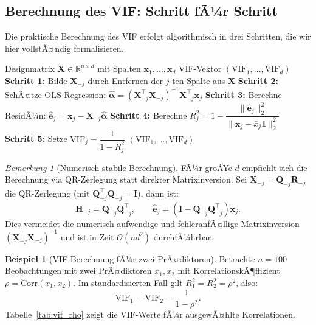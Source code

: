 ﻿\documentclass[12pt, a4paper]{article}
\theoremstyle{definition}
\newtheorem{example}[theorem]{Beispiel}
\theoremstyle{remark}
\newtheorem{remark}[theorem]{Bemerkung}
\newcommand{\R}{\mathbb{R}}
\newcommand{\vx}{\bm{x}}
\newcommand{\vX}{\bm{X}}
\newcommand{\T}{\top}
\begin{document}
\subsection{Berechnung des VIF: Schritt fÃ¼r Schritt}

Die praktische Berechnung des VIF erfolgt algorithmisch in drei Schritten, die wir hier
vollstÃ¤ndig formalisieren.

\begin{algorithm}[H]
	\caption{Berechnung der Varianzinflationsfaktoren}
	\label{alg:vif}
	\begin{algorithmic}[1]
		\Require Designmatrix $\vX \in \R^{n \times d}$ mit Spalten $\vx_1, \ldots, \vx_d$
		\Ensure VIF-Vektor $(\mathrm{VIF}_1, \ldots, \mathrm{VIF}_d)$
		\State \textbf{Schritt 1:} Bilde $\vX_{-j}$ durch Entfernen der $j$-ten Spalte aus $\vX$
		\State \textbf{Schritt 2:} SchÃ¤tze OLS-Regression: $\hat{\bm{\alpha}} = (\vX_{-j}^\T\vX_{-j})^{-1}\vX_{-j}^\T\vx_j$
		\State \textbf{Schritt 3:} Berechne ResidÃ¼n: $\hat{\bm{e}}_j = \vx_j - \vX_{-j}\hat{\bm{\alpha}}$
		\State \textbf{Schritt 4:} Berechne $R_j^2 = 1 - \dfrac{\|\hat{\bm{e}}_j\|_2^2}{\|\vx_j - \bar{x}_j\bm{1}\|_2^2}$
		\State \textbf{Schritt 5:} Setze $\mathrm{VIF}_j = \dfrac{1}{1 - R_j^2}$
		\EndFor
		\State \Return $(\mathrm{VIF}_1, \ldots, \mathrm{VIF}_d)$
	\end{algorithmic}
\end{algorithm}

\begin{remark}[Numerisch stabile Berechnung]
	FÃ¼r groÃŸe $d$ empfiehlt sich die Berechnung via QR-Zerlegung statt direkter 
	Matrixinversion. Sei $\vX_{-j} = \bm{Q}_{-j}\bm{R}_{-j}$ die QR-Zerlegung (mit 
	$\bm{Q}_{-j}^\T\bm{Q}_{-j} = \bm{I}$), dann ist:
	\[
	\bm{H}_{-j} = \bm{Q}_{-j}\bm{Q}_{-j}^\T, \qquad \hat{\bm{e}}_j = (\bm{I} - \bm{Q}_{-j}\bm{Q}_{-j}^\T)\vx_j.
	\]
	Dies vermeidet die numerisch aufwendige und fehleranfÃ¤llige Matrixinversion 
	$(\vX_{-j}^\T\vX_{-j})^{-1}$ und ist in Zeit $\mathcal{O}(nd^2)$ durchfÃ¼hrbar.
\end{remark}

\begin{example}[VIF-Berechnung fÃ¼r zwei PrÃ¤diktoren]
	Betrachte $n = 100$ Beobachtungen mit zwei PrÃ¤diktoren $x_1, x_2$ mit KorrelationskÃ¶ffizient
	$\rho = \mathrm{Corr}(x_1, x_2)$. Im standardisierten Fall gilt $R_1^2 = R_2^2 = \rho^2$, also:
	\begin{equation}
		\mathrm{VIF}_1 = \mathrm{VIF}_2 = \frac{1}{1 - \rho^2}.
		\label{eq:vif_two_predictors}
	\end{equation}
	Tabelle~\ref{tab:vif_rho} zeigt die VIF-Werte fÃ¼r ausgewÃ¤hlte Korrelationen.
\end{example}
\end{document}
